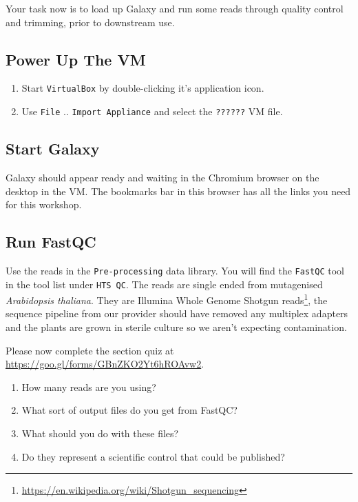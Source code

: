 \documentclass[12pt,]{book}
\providecommand{\tightlist}{%
  \setlength{\itemsep}{0pt}\setlength{\parskip}{0pt}}
\let\rmarkdownfootnote\footnote%
\def\footnote{\protect\rmarkdownfootnote}
\renewcommand{\href}[2]{#2\footnote{\url{#1}}}
\theoremstyle{definition}
\theoremstyle{definition}
\theoremstyle{remark}
\begin{document}
Your task now is to load up Galaxy and run some reads through quality
control and trimming, prior to downstream use.

\subsection{Power Up The VM}\label{power-up-the-vm}

\begin{enumerate}
\def\labelenumi{\arabic{enumi}.}
\tightlist
\item
  Start \texttt{VirtualBox} by double-clicking it's application icon.
\item
  Use \texttt{File} .. \texttt{Import\ Appliance} and select the
  \texttt{??????} VM file.
\end{enumerate}

\subsection{Start Galaxy}\label{start-galaxy}

Galaxy should appear ready and waiting in the Chromium browser on the
desktop in the VM. The bookmarks bar in this browser has all the links
you need for this workshop.

\subsection{Run FastQC}\label{run-fastqc}

Use the reads in the \texttt{Pre-processing} data library. You will find
the \texttt{FastQC} tool in the tool list under \texttt{HTS\ QC}. The
reads are single ended from mutagenised \emph{Arabidopsis thaliana}.
They are Illumina
\href{https://en.wikipedia.org/wiki/Shotgun_sequencing}{Whole Genome
Shotgun reads}, the sequence pipeline from our provider should have
removed any multiplex adapters and the plants are grown in sterile
culture so we aren't expecting contamination.

Please now complete the section quiz at
\url{https://goo.gl/forms/GBnZKO2Yt6hROAvw2}.

\begin{enumerate}
\def\labelenumi{\arabic{enumi}.}
\tightlist
\item
  How many reads are you using?
\item
  What sort of output files do you get from FastQC?
\item
  What should you do with these files?
\item
  Do they represent a scientific control that could be published?
\end{enumerate}
\end{document}

